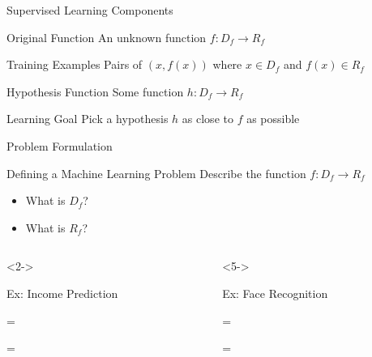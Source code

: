 \documentclass[14pt]{beamer}
\begin{document}
\begin{frame}{Supervised Learning Components}
\begin{block}{Original Function}
An unknown function $f\!: D_f \rightarrow R_f$
\end{block}
\pause
\begin{block}{Training Examples}
Pairs of $(x, f(x))$ where $x \in D_f$ and $f(x) \in R_f$
\end{block}
\pause
\begin{block}{Hypothesis Function}
Some function $h\!: D_f \rightarrow R_f$
\end{block}
\pause
\begin{block}{Learning Goal}
Pick a hypothesis $h$ as close to $f$ as possible
\end{block}
\end{frame}

\begin{frame}{Problem Formulation}
\begin{block}{Defining a Machine Learning Problem}
Describe the function $f\!: D_f \rightarrow R_f$
\begin{itemize}
\item What is $D_f$?
\item What is $R_f$?
\end{itemize}
\end{block}
\begin{columns}
\begin{column}{0.47\textwidth}<2->
\begin{block}{Ex: Income Prediction}
\begin{description}[$D_f$]
\item[$D_f$] = 
\item[$R_f$] = 
\end{description}
\end{block}
\end{column}
\begin{column}{0.47\textwidth}<5->
\begin{block}{Ex: Face Recognition}
\begin{description}[$D_f$]
\item[$D_f$] = 
\item[$R_f$] = 
\end{description}
\end{block}
\end{column}
\end{columns}
\end{frame}
\end{document}

